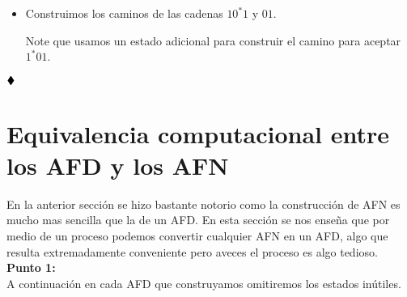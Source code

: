 \begin{itemize}[label={✎}]
        \item Construimos los caminos de las cadenas $10^*1$ y $01$.
        \begin{basedtikz}
        \end{basedtikz}
        Note que usamos un estado adicional para construir el camino para aceptar $1^*01$.
    \end{itemize}

    $\hfill \blacklozenge$

    \section{Equivalencia computacional entre los AFD y los AFN}

    En la anterior sección se hizo bastante notorio como la construcción de AFN es mucho mas sencilla que la de un AFD. En esta sección se nos enseña que por medio de un proceso podemos convertir cualquier AFN en un AFD, algo que resulta extremadamente conveniente pero aveces el proceso es algo tedioso.\\ 

    \textbf{Punto 1:}\\ 
    A continuación en cada AFD que construyamos omitiremos los estados inútiles.\\

